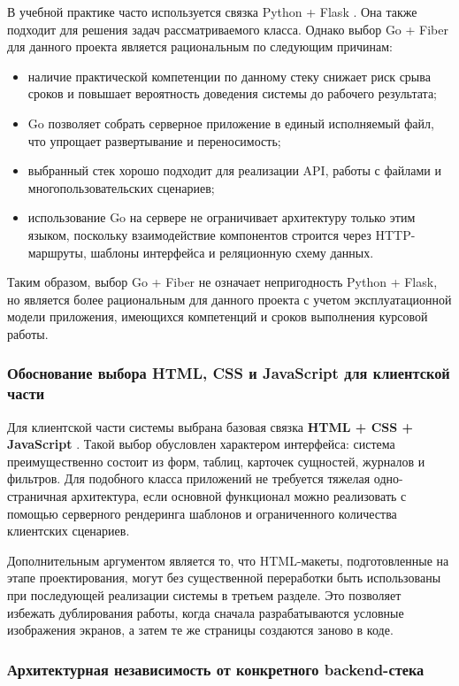 В учебной практике часто используется связка Python + Flask \cite{flask_official}. Она также подходит для решения задач рассматриваемого класса. Однако выбор Go + Fiber для данного проекта является рациональным по следующим причинам:
\begin{itemize}
    \item наличие практической компетенции по данному стеку снижает риск срыва сроков и повышает вероятность доведения системы до рабочего результата;
    \item Go позволяет собрать серверное приложение в единый исполняемый файл, что упрощает развертывание и переносимость;
    \item выбранный стек хорошо подходит для реализации API, работы с файлами и многопользовательских сценариев;
    \item использование Go на сервере не ограничивает архитектуру только этим языком, поскольку взаимодействие компонентов строится через HTTP-маршруты, шаблоны интерфейса и реляционную схему данных.
\end{itemize}

Таким образом, выбор Go + Fiber не означает непригодность Python + Flask, но является более рациональным для данного проекта с учетом эксплуатационной модели приложения, имеющихся компетенций и сроков выполнения курсовой работы.

\subsubsection{Обоснование выбора HTML, CSS и JavaScript для клиентской части}

Для клиентской части системы выбрана базовая связка \textbf{HTML + CSS + JavaScript} \cite{mdn_html,mdn_css,mdn_js}. Такой выбор обусловлен характером интерфейса: система преимущественно состоит из форм, таблиц, карточек сущностей, журналов и фильтров. Для подобного класса приложений не требуется тяжелая одно-страничная архитектура, если основной функционал можно реализовать с помощью серверного рендеринга шаблонов и ограниченного количества клиентских сценариев.

Дополнительным аргументом является то, что HTML-макеты, подготовленные на этапе проектирования, могут без существенной переработки быть использованы при последующей реализации системы в третьем разделе. Это позволяет избежать дублирования работы, когда сначала разрабатываются условные изображения экранов, а затем те же страницы создаются заново в коде.

\subsubsection{Архитектурная независимость от конкретного backend-стека}

